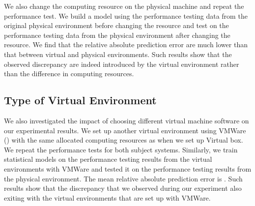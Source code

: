 We also change the computing resource on the physical machine and repeat the performance test. We build a model using the performance testing data from the original physical environment before changing the resource and test on the performance testing data from the physical environment after changing the resource. We find that the relative absolute prediction error are much lower than that between virtual and physical environments. Such results show that the observed discrepancy are indeed introduced by the virtual environment rather than the difference in computing resources.




\subsection{Type of Virtual Environment}

We also investigated the impact of choosing different virtual machine software on our experimental results. We set up another virtual environment using VMWare () with the same allocated computing resources as when we set up Virtual box. We repeat the performance tests for both subject systems. Similarly, we train statistical models on the performance testing results from the virtual environments with VMWare and tested it on the performance testing results from the physical environment. The mean relative absolute prediction error is . Such results show that the discrepancy that we observed during our experiment also exiting with the virtual environments that are set up with VMWare.


